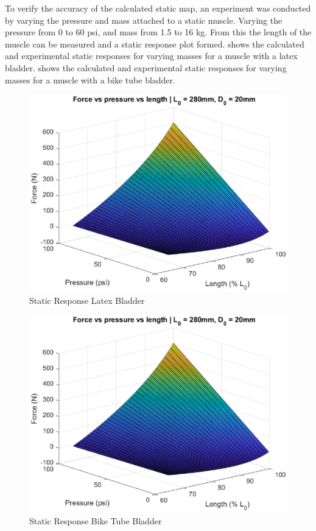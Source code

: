 \documentclass[11pt,a4paper]{article}
\begin{document}
To verify the accuracy of the calculated static map, an experiment was conducted by varying the pressure and mass attached to a static muscle. Varying the pressure from 0 to 60 psi, and mass from 1.5 to 16 kg. From this the length of the muscle can be measured and a static response plot formed.  shows the calculated and experimental static responses for varying masses for a muscle with a latex bladder.  shows the calculated and experimental static responses for varying masses for a muscle with a bike tube bladder.

\begin{figure}[!hbt]
    \centering
    \includegraphics[scale=1]{staticmap.eps}
    \caption{Static Response Latex Bladder}
    \label{fig:static_response_latex}
\end{figure}

\begin{figure}[!hbt]
    \centering
    \includegraphics[scale=1]{staticmap.eps}
    \caption{Static Response Bike Tube Bladder}
    \label{fig:static_response_bike}
\end{figure}
\end{document}
